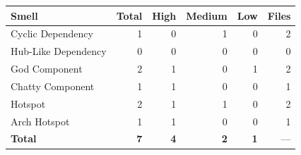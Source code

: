 \begin{tabular}{l|r|r|r|r|r}
\hline
\textbf{Smell} & \textbf{Total} & \textbf{High} & \textbf{Medium} & \textbf{Low} & \textbf{Files} \\
\hline
Cyclic Dependency & 1 & 0 & 1 & 0 & 2 \\
Hub-Like Dependency & 0 & 0 & 0 & 0 & 0 \\
God Component & 2 & 1 & 0 & 1 & 2 \\
Chatty Component & 1 & 1 & 0 & 0 & 1 \\
Hotspot & 2 & 1 & 1 & 0 & 2 \\
Arch Hotspot & 1 & 1 & 0 & 0 & 1 \\
\hline
\textbf{Total}       & \textbf{7} & \textbf{4} & \textbf{2} & \textbf{1} & --- \\
\hline
\end{tabular}
